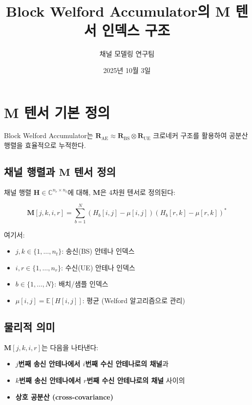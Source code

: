 \documentclass[10pt]{article}
\begin{document}
\title{Block Welford Accumulator의 $\mathbf{M}$ 텐서 인덱스 구조}
\author{채널 모델링 연구팀}
\date{2025년 10월 3일}
\maketitle

\section{$\mathbf{M}$ 텐서 기본 정의}

Block Welford Accumulator는 $\mathbf{R}_{\text{AE}} \approx \mathbf{R}_{\text{BS}} \otimes \mathbf{R}_{\text{UE}}$ 크로네커 구조를 활용하여 공분산 행렬을 효율적으로 누적한다.

\subsection{채널 행렬과 $\mathbf{M}$ 텐서 정의}

채널 행렬 $\mathbf{H} \in \mathbb{C}^{n_r \times n_t}$에 대해, $\mathbf{M}$은 4차원 텐서로 정의된다:

\begin{equation}
\mathbf{M}[j,k,i,r] = \sum_{b=1}^{N} \left(H_b[i,j] - \mu[i,j]\right) \left(H_b[r,k] - \mu[r,k]\right)^*
\end{equation}

여기서:
\begin{itemize}
    \item $j, k \in \{1, \ldots, n_t\}$: 송신(BS) 안테나 인덱스
    \item $i, r \in \{1, \ldots, n_r\}$: 수신(UE) 안테나 인덱스
    \item $b \in \{1, \ldots, N\}$: 배치/샘플 인덱스
    \item $\mu[i,j] = \mathbb{E}[H[i,j]]$: 평균 (Welford 알고리즘으로 관리)
\end{itemize}

\subsection{물리적 의미}

$\mathbf{M}[j,k,i,r]$는 다음을 나타낸다:
\begin{itemize}
    \item \textbf{$j$번째 송신 안테나에서 $i$번째 수신 안테나로의 채널}과
    \item \textbf{$k$번째 송신 안테나에서 $r$번째 수신 안테나로의 채널} 사이의
    \item \textbf{상호 공분산 (cross-covariance)}
\end{itemize}
\end{document}
